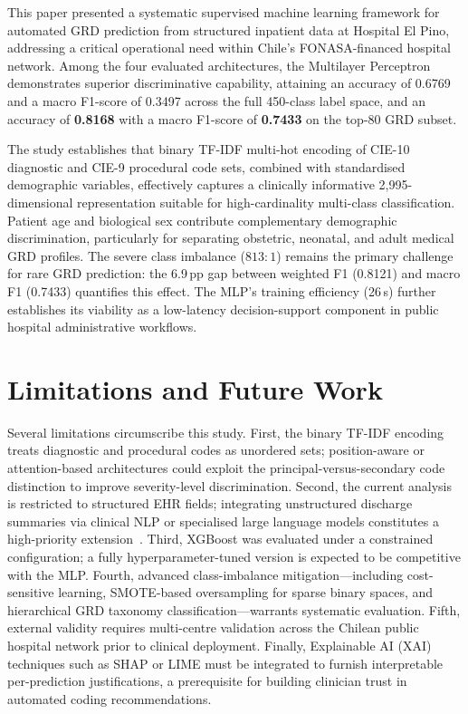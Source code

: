 \documentclass[journal]{IEEEtran}
\begin{document}
This paper presented a systematic supervised machine learning
framework for automated GRD prediction from structured inpatient
data at Hospital El Pino, addressing a critical operational need
within Chile's FONASA-financed hospital network.  Among the four
evaluated architectures, the Multilayer Perceptron demonstrates
superior discriminative capability, attaining an accuracy of
0.6769 and a macro F1-score of 0.3497 across the full 450-class
label space, and an accuracy of \textbf{0.8168} with a macro
F1-score of \textbf{0.7433} on the top-80 GRD subset.

The study establishes that binary TF-IDF multi-hot encoding
of CIE-10 diagnostic and CIE-9 procedural code sets, combined
with standardised demographic variables, effectively captures
a clinically informative 2,995-dimensional representation
suitable for high-cardinality multi-class classification.
Patient age and biological sex contribute complementary
demographic discrimination, particularly for separating obstetric,
neonatal, and adult medical GRD profiles.  The severe class
imbalance ($813{:}1$) remains the primary challenge for rare
GRD prediction: the 6.9\,pp gap between weighted F1 (0.8121)
and macro F1 (0.7433) quantifies this effect.  The MLP's
training efficiency (26\,s) further establishes its viability
as a low-latency decision-support component in public hospital
administrative workflows.

\section{Limitations and Future Work}
\label{sec:limitations}

Several limitations circumscribe this study.  First, the binary
TF-IDF encoding treats diagnostic and procedural codes as
unordered sets; position-aware or attention-based architectures
could exploit the principal-versus-secondary code distinction
to improve severity-level discrimination.  Second, the current
analysis is restricted to structured EHR fields; integrating
unstructured discharge summaries via clinical NLP or specialised
large language models constitutes a high-priority
extension~\cite{mullenbach2018}.  Third, XGBoost was evaluated
under a constrained configuration; a fully hyperparameter-tuned
version is expected to be competitive with the MLP.  Fourth,
advanced class-imbalance mitigation---including cost-sensitive
learning, SMOTE-based oversampling for sparse binary spaces,
and hierarchical GRD taxonomy classification---warrants
systematic evaluation.  Fifth, external validity requires
multi-centre validation across the Chilean public hospital
network prior to clinical deployment.  Finally, Explainable
AI (XAI) techniques such as SHAP or LIME must be integrated
to furnish interpretable per-prediction justifications, a
prerequisite for building clinician trust in automated coding
recommendations.
\end{document}
